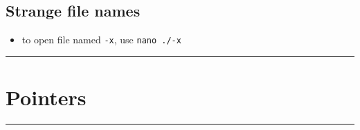 \documentclass[10pt, multicolumn, a4paper]{article}
\begin{document}
\begin{multicols}{2}
	\subsection*{Strange file names}
	\begin{itemize}
	\item to open file named \verb|-x|, use \verb|nano ./-x|
	\end{itemize}
\end{multicols}


\hrule
\section{Pointers}
\hrule 
\end{document}
